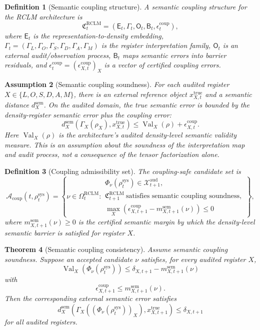 \documentclass[11pt,a4paper]{article}
\newtheorem{theorem}{Theorem}[section]
\newtheorem{definition}[theorem]{Definition}
\newtheorem{assumption}[theorem]{Assumption}
\newcommand{\Acal}{\mathcal A}
\newcommand{\Xcal}{\mathcal X}
\newcommand{\RCLM}{\mathrm{RCLM}}
\newcommand{\sem}{\mathrm{sem}}
\newcommand{\sys}{\mathrm{sys}}
\newcommand{\true}{\mathrm{true}}
\newcommand{\aud}{\mathrm{aud}}
\newcommand{\Val}{\operatorname{Val}}
\newcommand{\coup}{\mathrm{coup}}
\begin{document}
\begin{definition}[Semantic coupling structure]
A semantic coupling structure for the RCLM architecture is
\[
\mathfrak C_t^{\RCLM}=(\mathsf E_t,\Gamma_t,\mathsf O_t,\mathsf B_t,\epsilon_t^{\coup}),
\]
where \(\mathsf E_t\) is the representation-to-density embedding, \(\Gamma_t=(\Gamma_L,\Gamma_O,\Gamma_S,\Gamma_D,\Gamma_A,\Gamma_M)\) is the register interpretation family, \(\mathsf O_t\) is an external audit/observation process, \(\mathsf B_t\) maps semantic errors into barrier residuals, and \(\epsilon_t^{\coup}=(\epsilon_{X,t}^{\coup})_X\) is a vector of certified coupling errors.
\end{definition}

\begin{assumption}[Semantic coupling soundness]
For each audited register \(X\in\{L,O,S,D,A,M\}\), there is an external reference object \(x_{X,t}^{\true}\) and a semantic distance \(d_X^{\sem}\). On the audited domain, the true semantic error is bounded by the density-register semantic error plus the coupling error:
\[
d_X^{\sem}(\Gamma_X(\rho_X),x_{X,t}^{\true})
\le
\Val_X(\rho)+\epsilon_{X,t}^{\coup}.
\]
Here \(\Val_X(\rho)\) is the architecture's audited density-level semantic validity measure. This is an assumption about the soundness of the interpretation map and audit process, not a consequence of the tensor factorization alone.
\end{assumption}

\begin{definition}[Coupling admissibility set]
The coupling-safe candidate set is
\[
\Acal_{\coup}(t,\rho_t^{\sys})
=
\left\{\nu\in\Omega_t^{\RCLM}:
\begin{array}{l}
\Phi_\nu(\rho_t^{\sys})\in\Xcal_{t+1}^{\aud},\\
\mathfrak C_{t+1}^{\RCLM}\ \text{satisfies semantic coupling soundness},\\
\max_X(\epsilon_{X,t+1}^{\coup}-m_{X,t+1}^{\sem}(\nu))\le0
\end{array}
\right\},
\]
where \(m_{X,t+1}^{\sem}(\nu)\ge0\) is the certified semantic margin by which the density-level semantic barrier is satisfied for register \(X\).
\end{definition}

\begin{theorem}[Semantic coupling consistency]
\label{thm:semantic-coupling-consistency}
Assume semantic coupling soundness. Suppose an accepted candidate \(\nu\) satisfies, for every audited register \(X\),
\[
\Val_X(\Phi_\nu(\rho_t^{\sys}))\le \delta_{X,t+1}-m_{X,t+1}^{\sem}(\nu)
\]
with
\[
\epsilon_{X,t+1}^{\coup}\le m_{X,t+1}^{\sem}(\nu).
\]
Then the corresponding external semantic error satisfies
\[
d_X^{\sem}\!\left(\Gamma_X((\Phi_\nu(\rho_t^{\sys}))_X),x_{X,t+1}^{\true}\right)
\le \delta_{X,t+1}
\]
for all audited registers.
\end{theorem}
\end{document}
